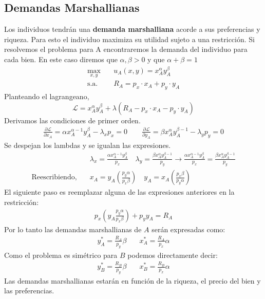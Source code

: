 \subsection{Demandas Marshallianas}

Los individuos tendrán una \textbf{demanda marshalliana} acorde a sus preferencias y riqueza. Para esto el individuo maximiza su utilidad sujeto a una restricción. Si resolvemos el problema para A encontraremos la demanda del individuo para cada bien. En este caso diremos que $\alpha,\beta >0$ y que $\alpha + \beta = 1$
\begin{align*}
    \max_{x,y} &\quad u_A(x,y) = x_A^\alpha y_A^{\beta}\quad \\
    \text{s.a.} &\quad R_A = p_x \cdot x_A + p_y \cdot y_A
\end{align*}
Planteando el lagrangeano,
\begin{equation*}
    \mathcal{L}= x_A^\alpha y_A^{\beta} + \lambda (R_A - p_x \cdot x_A - p_y \cdot y_A)
\end{equation*}
Derivamos las condiciones de primer orden.
\begin{align*}
    \frac{\partial \mathcal{L}}{\partial x_A} = \alpha x_A^{\alpha-1}y_A^\beta - \lambda_x p_x = 0 \quad \quad
    \frac{\partial \mathcal{L}}{\partial y_A} = \beta x_A^\alpha y_A^{\beta -1} - \lambda_y p_y = 0
\end{align*}
Se despejan los lambdas y se igualan las expresiones.
\begin{align*}
    & \lambda_x = \frac{\alpha x_A^{\alpha-1}y_A^\beta }{p_x} \quad 
    \lambda_y = \frac{\beta x_A^\alpha y_A^{\beta-1}}{p_y} \longrightarrow \frac{\alpha x_A^{\alpha-1}y_A^\beta }{p_x} = \frac{\beta x_A^\alpha y_A^{\beta-1}}{p_y} \\
    \text{Reescribiendo,}\quad & x_A = y_A  \left( \frac{p_y \alpha}{p_x \beta} \right)  \quad y_A = x_A \left(  \frac{p_x \beta}{p_y\alpha}  \right)
\end{align*}
El siguiente paso es reemplazar alguna de las expresiones anteriores en la restricción:
\begin{align*}
    p_x\left( y_A\frac{p_y\alpha}{p_x\beta} \right) + p_yy_A = R_A
\end{align*}
Por lo tanto las demandas marshallianas de $A$ serán expresadas como:
\begin{align*}
    y_A^* = \frac{R_A}{p_y} \beta & \quad  x_A^* = \frac{R_A}{p_x} \alpha
\end{align*}
Como el problema es simétrico para $B$ podemos directamente decir:
\begin{align*}
    y_B^* = \frac{R_B}{p_y} \beta & \quad  x_B^* = \frac{R_B}{p_x} \alpha
\end{align*}
Las demandas marshallianas estarán en función de la riqueza, el precio del bien y las preferencias.

